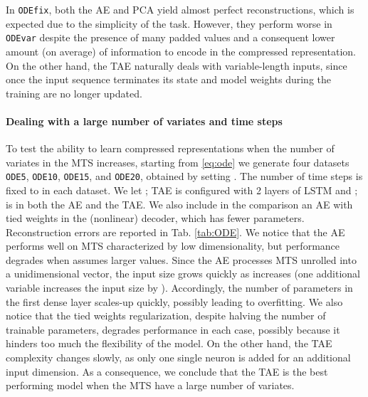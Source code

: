 \documentclass[a4paper,10pt,pdftex]{article}
\begin{document}
In \texttt{ODEfix}, both the AE and PCA yield almost perfect reconstructions, which is expected due to the simplicity of the task.
However, they perform worse in \texttt{ODEvar} despite the presence of many padded values and a consequent lower amount (on average) of information to encode in the compressed representation.
On the other hand, the TAE naturally deals with variable-length inputs, since once the input sequence terminates its state and model weights during the training are no longer updated.

\paragraph{\textbf{Dealing with a large number of variates and time steps}}

To test the ability to learn compressed representations when the number of variates in the MTS increases, starting from \eqref{eq:ode} we generate four datasets \texttt{ODE5}, \texttt{ODE10}, \texttt{ODE15}, and \texttt{ODE20}, obtained by setting . 
The number of time steps is fixed to  in each dataset.
We let ; TAE is configured with 2 layers of LSTM and ;  is  in both the AE and the TAE.
We also include in the comparison an AE with tied weights in the (nonlinear) decoder, which has fewer parameters.
Reconstruction errors are reported in Tab. \ref{tab:ODE}.
We notice that the AE performs well on MTS characterized by low dimensionality, but performance degrades when  assumes larger values.
Since the AE processes MTS unrolled into a unidimensional vector, the input size grows quickly as  increases (one additional variable increases the input size by ). 
Accordingly, the number of parameters in the first dense layer scales-up quickly, possibly leading to overfitting. 
We also notice that the tied weights regularization, despite halving the number of trainable parameters, degrades performance in each case, possibly because it hinders too much the flexibility of the model.
On the other hand, the TAE complexity changes slowly, as only one single neuron is added for an additional input dimension.
As a consequence, we conclude that the TAE is the best performing model when the MTS have a large number of variates.
\bgroup
\end{document}
